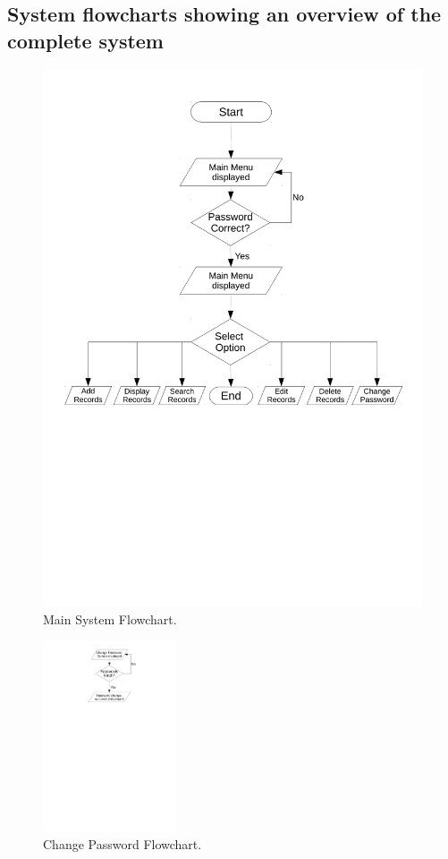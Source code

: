 \newpage

\subsection{System flowcharts showing an overview of the complete system}


\begin{figure}[H]
    \includegraphics[width=\textwidth]{./Design/system_flowcharts/PDFs/main_system_flowchart.pdf}
    \caption{Main System Flowchart.} \label{fig:print_function_result}
\end{figure}

\begin{figure}[H]
    \begin{center}
        \includegraphics[width=150px]{./Design/system_flowcharts/PDFs/change_password.pdf}
    \end{center}
    \caption{Change Password Flowchart.} \label{fig:print_function_result}
\end{figure}



